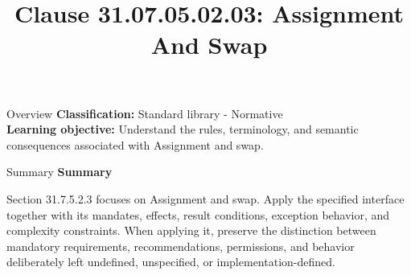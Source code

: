 \documentclass[10pt,letterpaper]{article}
\title{Clause 31.07.05.02.03: Assignment And Swap}
\author{}
\date{}
\begin{document}
\maketitle
\begin{CornellOverviewBox}{Overview}
\textbf{Classification:} Standard library - Normative\\[2pt]
\textbf{Learning objective:} Understand the rules, terminology, and semantic consequences associated with Assignment and swap.
\end{CornellOverviewBox}\begin{CornellSummaryBox}{Summary}
{\sffamily\bfseries\color{Accent} Summary}\par\vspace{3pt}Section 31.7.5.2.3 focuses on Assignment and swap. Apply the specified interface together with its mandates, effects, result conditions, exception behavior, and complexity constraints. When applying it, preserve the distinction between mandatory requirements, recommendations, permissions, and behavior deliberately left undefined, unspecified, or implementation-defined.
\end{CornellSummaryBox}
\end{document}
